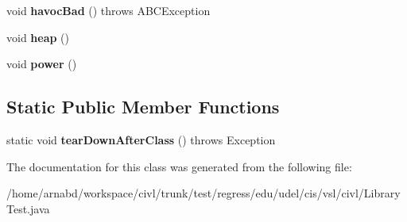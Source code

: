 \begin{DoxyCompactItemize}
\item 
\hypertarget{classedu_1_1udel_1_1cis_1_1vsl_1_1civl_1_1LibraryTest_adef88bf56fe80301605deafa88c92c8a}{}void {\bfseries havoc\+Bad} ()  throws A\+B\+C\+Exception \label{classedu_1_1udel_1_1cis_1_1vsl_1_1civl_1_1LibraryTest_adef88bf56fe80301605deafa88c92c8a}

\item 
\hypertarget{classedu_1_1udel_1_1cis_1_1vsl_1_1civl_1_1LibraryTest_a6096e3d4386250ef08c413622cdbe0b5}{}void {\bfseries heap} ()\label{classedu_1_1udel_1_1cis_1_1vsl_1_1civl_1_1LibraryTest_a6096e3d4386250ef08c413622cdbe0b5}

\item 
\hypertarget{classedu_1_1udel_1_1cis_1_1vsl_1_1civl_1_1LibraryTest_ac1b89164bc73b8775fd8c907cc9a6eb4}{}void {\bfseries power} ()\label{classedu_1_1udel_1_1cis_1_1vsl_1_1civl_1_1LibraryTest_ac1b89164bc73b8775fd8c907cc9a6eb4}

\end{DoxyCompactItemize}
\subsection*{Static Public Member Functions}
\begin{DoxyCompactItemize}
\item 
\hypertarget{classedu_1_1udel_1_1cis_1_1vsl_1_1civl_1_1LibraryTest_aa79c33a92c317f2c05d36f9b62fe3a90}{}static void {\bfseries tear\+Down\+After\+Class} ()  throws Exception \label{classedu_1_1udel_1_1cis_1_1vsl_1_1civl_1_1LibraryTest_aa79c33a92c317f2c05d36f9b62fe3a90}

\end{DoxyCompactItemize}


The documentation for this class was generated from the following file\+:\begin{DoxyCompactItemize}
\item 
/home/arnabd/workspace/civl/trunk/test/regress/edu/udel/cis/vsl/civl/Library\+Test.\+java\end{DoxyCompactItemize}
